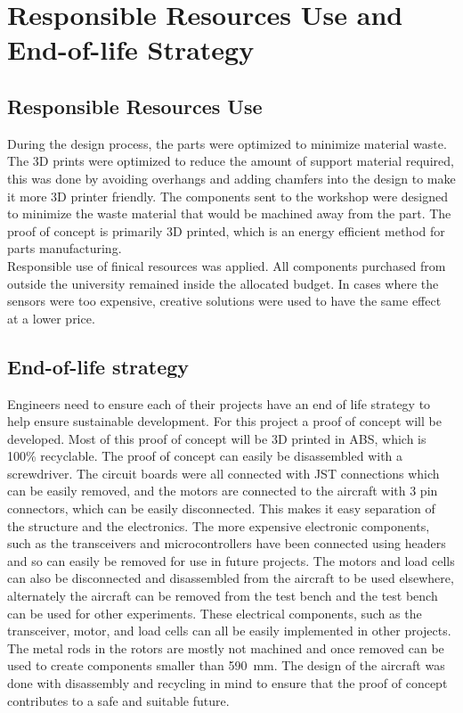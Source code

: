 \chapter{Responsible Resources Use and End-of-life Strategy}
\label{sec: Resources}
    \section{Responsible Resources Use}
        During the design process, the parts were optimized to minimize material waste. The 3D prints were optimized to reduce the amount of support material required, this was done by avoiding overhangs and adding chamfers into the design to make it more 3D printer friendly. The components sent to the workshop were designed to minimize the waste material that would be machined away from the part. The proof of concept is primarily 3D printed, which is an energy efficient method for parts manufacturing.\\
        Responsible use of finical resources was applied. All components purchased from outside the university remained inside the allocated budget. In cases where the sensors were too expensive, creative solutions were used to have the same effect at a lower price.

    \section{End-of-life strategy}
        Engineers need to ensure each of their projects have an end of life strategy to help ensure sustainable development. For this project a proof of concept will be developed. Most of this proof of concept will be 3D printed in ABS, which is 100\% recyclable. The proof of concept can easily be disassembled with a screwdriver. The circuit boards were all connected with JST connections which can be easily removed, and the motors are connected to the aircraft with 3 pin connectors, which can be easily disconnected. This makes it easy separation of the structure and the electronics. The more expensive electronic components, such as the transceivers and microcontrollers have been connected using headers and so can easily be removed for use in future projects. The motors and load cells can also be disconnected and disassembled from the aircraft to be used elsewhere, alternately the aircraft can be removed from the test bench and the test bench can be used for other experiments. These electrical components, such as the transceiver, motor, and load cells can all be easily implemented in other projects. The metal rods in the rotors are mostly not machined and once removed can be used to create components smaller than 590~mm. The design of the aircraft was done with disassembly and recycling in mind to ensure that the proof of concept contributes to a safe and suitable future.

